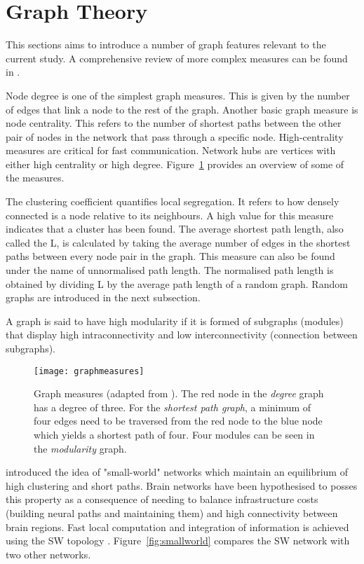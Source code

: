 	\section{Graph Theory}
	This sections aims to introduce a number of graph features relevant to the current study. A comprehensive review of more complex measures can be found in \autocite{Rubinov2010}.

	Node degree is one of the simplest graph measures. This is given by the number of edges that link a node to the rest of the graph. Another basic graph measure is node centrality. This refers to the number of shortest paths between the other pair of nodes in the network that pass through a specific node. High-centrality measures are critical for fast communication. Network hubs are vertices with either high centrality or high degree. Figure~\ref{fig:graphmeasures} provides an overview of some of the measures.  
	
	The clustering coefficient quantifies local segregation. It refers to how densely connected is a node relative to its neighbours. A high value for this measure indicates that a cluster has been found. The average shortest path length, also called the \ac{L}, is calculated by taking the average number of edges in the shortest paths between every node pair in the graph. This measure can also be found under the name of unnormalised path length. The normalised path length is obtained by dividing \ac{L} by the average path length of a random graph. Random graphs are introduced in the next subsection. 

	A graph is said to have high modularity if it is formed of subgraphs (modules) that display high intraconnectivity and low interconnectivity (connection between subgraphs). 

	\begin{figure}
		    \centering
		    \texttt{[image: graphmeasures]}
		    \caption{Graph measures (adapted from \textcite{Stam2012}). The red node in the \textit{degree} graph has a degree of three. For the \textit{shortest path graph}, a minimum of four edges need to be traversed from the red node to the blue node which yields a shortest path of four. Four modules can be seen in the \textit{modularity} graph.}
		    \label{fig:graphmeasures}
	\end{figure}   

	\textcite{Watts1998} introduced the idea of "small-world" networks which maintain an equilibrium of high clustering and short paths. Brain networks have been hypothesised to posses this property as a consequence of needing to balance infrastructure costs (building neural paths and maintaining them) and high connectivity between brain regions. Fast local computation and integration of information is achieved using the \ac{SW} topology \autocite{Bullmore2009}. Figure~\ref{fig:smallworld} compares the \ac{SW} network with two other networks.


